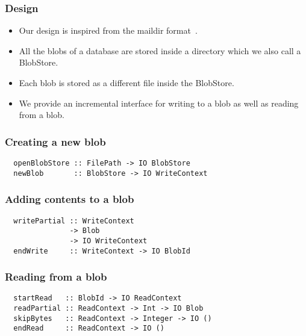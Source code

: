 \documentclass[10pt]{beamer}
\begin{document}
\begin{frame}
  \frametitle{Design}
  \begin{itemize}[<+->]
    \item Our design is inspired from the maildir format~.
    \item All the blobs of a database are stored inside a directory which we also call a \alert{BlobStore}.
    \item Each blob is stored as a different file inside the BlobStore.
    \item We provide an incremental interface for writing to a blob as well as reading from a blob.
  \end{itemize}
\end{frame}

\begin{frame}[fragile]
  \frametitle{Creating a new blob}
  \begin{verbatim}
  openBlobStore :: FilePath -> IO BlobStore
  newBlob       :: BlobStore -> IO WriteContext
  \end{verbatim}
  \vspace{1cm}
  \pause
  \small
\end{frame}

\begin{frame}[fragile]
  \frametitle{Adding contents to a blob}
  \begin{verbatim}
  writePartial :: WriteContext
               -> Blob
               -> IO WriteContext
  endWrite     :: WriteContext -> IO BlobId
  \end{verbatim}
  \vspace{1cm}
  \pause
  \small
\end{frame}

\begin{frame}[fragile]
  \frametitle{Reading from a blob}
  \begin{verbatim}
  startRead   :: BlobId -> IO ReadContext
  readPartial :: ReadContext -> Int -> IO Blob
  skipBytes   :: ReadContext -> Integer -> IO ()
  endRead     :: ReadContext -> IO ()
  \end{verbatim}
\end{frame}
\end{document}
